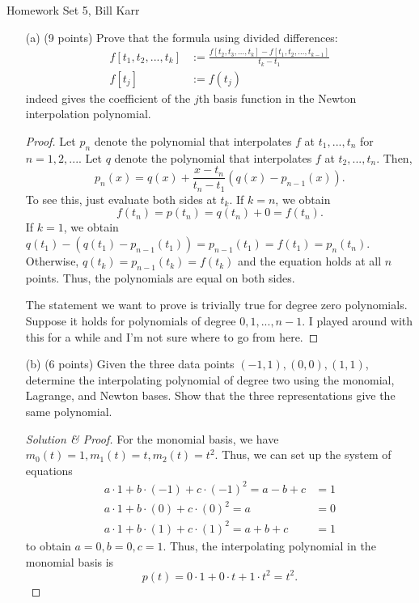 \documentclass[10pt]{article}
\begin{document}
%
{Homework Set 5, Bill Karr}


\begin{itemize}

\item[(a)] (9 points) Prove that the formula using divided differences: \begin{align*}
f[t_1, t_2, ... ,t_k] &:= \frac{f[t_2, t_3, ... ,t_k] - f[t_1, t_2, ... ,t_{k-1}]}{t_k - t_1} \\
f[t_j] &:= f(t_j) \end{align*} indeed gives the coefficient of the $j$th basis function in the Newton interpolation polynomial.

\begin{proof}
Let $p_n$ denote the polynomial that interpolates $ f $ at $ t_1, ... , t_n $ for $ n = 1, 2, ... $. Let $ q $ denote the polynomial that interpolates $ f $ at $ t_2, ... , t_n $. Then, $$
p_n(x) = q(x) + \frac{x - t_n}{t_n - t_1}( q(x) - p_{n-1}(x) ).
$$ To see this, just evaluate both sides at $ t_k $. If $ k = n $, we obtain $$
f(t_n) = p(t_n) = q(t_n) + 0 = f(t_n).
$$  If $ k = 1 $, we obtain $ q(t_1) - ( q(t_1) - p_{n-1}(t_1) ) = p_{n-1}(t_1) = f(t_1) = p_n(t_n) $. Otherwise, $ q(t_k) = p_{n-1}(t_k) = f(t_k) $ and the equation holds at all $n$ points. Thus, the polynomials are equal on both sides.

The statement we want to prove is trivially true for degree zero polynomials. Suppose it holds for polynomials of degree $ 0, 1, ..., n-1 $. I played around with this for a while and I'm not sure where to go from here.
\end{proof}

\item[(b)] (6 points) Given the three data points $ (-1,1),(0,0),(1,1) $, determine the interpolating polynomial of degree two using the monomial, Lagrange, and Newton bases. Show that the three representations give the same polynomial.

\begin{proof}[Solution \& Proof]
For the monomial basis, we have $ m_0(t) = 1, m_1(t) = t, m_2(t) = t^2 $. Thus, we can set up the system of equations \begin{align*}
a \cdot 1 + b \cdot (-1) + c \cdot (-1)^2 = a - b + c &= 1 \\
a \cdot 1 + b \cdot (0) + c \cdot (0)^2 = a &= 0 \\
a \cdot 1 + b \cdot (1) + c \cdot (1)^2 = a + b + c &= 1 
\end{align*} to obtain $ a = 0, b = 0, c = 1 $. Thus, the interpolating polynomial in the monomial basis is $$
p(t) = 0 \cdot 1 + 0 \cdot t + 1 \cdot t^2 = t^2.
$$


\end{proof}
\end{itemize}
\end{document}
